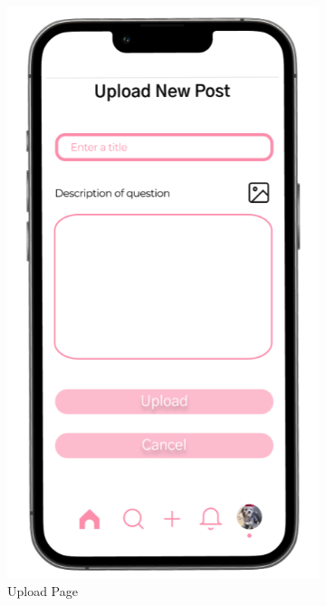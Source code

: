 \begin{figure}[!htbp]
  \centering
  \begin{subfigure}[b]{0.3\textwidth}
    \includegraphics[width=\textwidth]{Figures/upload.png}
    \caption{Upload Page}
    \label{fig:upload}
  \end{subfigure}
  \hfill
  \begin{subfigure}[b]{0.3\textwidth}

\end{subfigure}
\end{figure}
